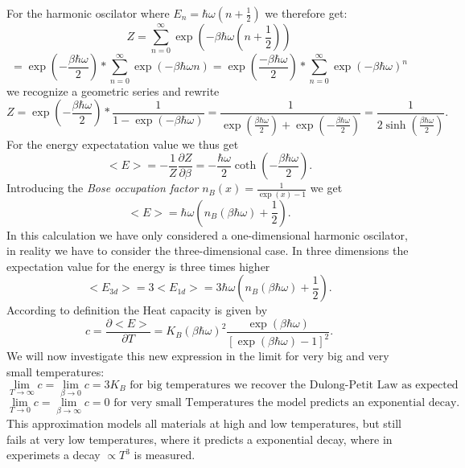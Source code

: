 \documentclass{report}
\begin{document}
For the harmonic oscilator where $E_n = \hbar \omega \left( n + \frac{1}{2} \right) $ we therefore get: \[
	Z = \sum_{n=0}^{\infty} \exp\left( -\beta \hbar \omega \left( n + \frac{1}{2} \right)  \right) 
\] \[
= \exp\left( -\frac{\beta \hbar \omega}{2} \right) * \sum_{n=0}^{\infty} \exp\left( -\beta \hbar \omega n \right) = \exp\left( \frac{-\beta \hbar \omega}{2} \right) * \sum_{n=0}^{\infty} \exp\left( -\beta \hbar \omega \right) ^n
\] we recognize a geometric series and rewrite \[
Z = \exp\left( -\frac{\beta \hbar \omega}{2} \right) * \frac{1}{1- \exp\left( -\beta \hbar \omega \right) } = \frac{1}{\exp\left( \frac{\beta \hbar \omega}{2} \right) + \exp\left(-  \frac{\beta \hbar \omega}{2} \right) } = \frac{1}{2 \sinh\left( \frac{\beta \hbar \omega}{2} \right) }
.\] For the energy expectatation value we thus get \[
<E> = -\frac{1}{Z} \frac{\partial Z}{\partial \beta} = - \frac{\hbar \omega}{2} \coth\left( -\frac{\beta \hbar \omega}{2} \right) 
.\] Introducing the \emph{Bose occupation factor} $n_B(x) = \frac{1}{\exp\left( x \right) -1}$ we get \[
<E> = \hbar \omega \left( n_B\left( \beta \hbar \omega \right) + \frac{1}{2} \right) 
.\] In this calculation we have only considered a one-dimensional harmonic oscilator, in reality we have to consider the three-dimensional case. In three dimensions the expectation value for the energy is three times higher \[
<E_{3d}> = 3 <E_{1d}> = 3 \hbar \omega \left( n_B\left( \beta \hbar \omega \right) + \frac{1}{2} \right) 
.\] According to definition the Heat capacity is given by \[
c = \frac{\partial <E>}{\partial T} = K_B \left( \beta \hbar \omega \right) ^2 \frac{\exp\left( \beta \hbar \omega \right) }{\left[ \exp\left( \beta \hbar \omega \right) -1  \right] ^2}
.\] We will now investigate this new expression in the limit for very big and very small temperatures: \[
\lim_{T \to \infty} c = \lim_{\beta \to 0} c = 3K_B \text{ for big temperatures we recover the Dulong-Petit Law as expected}
\]  \[
\lim_{T \to 0} c = \lim_{\beta \to \infty} c = 0 \text{ for very small Temperatures the model predicts an exponential decay.}
\] 
This approximation models all materials at high and low temperatures, but still fails at very low temperatures, where it predicts a exponential decay, where in experimets a decay $\propto T^3$ is measured.
\end{document}
